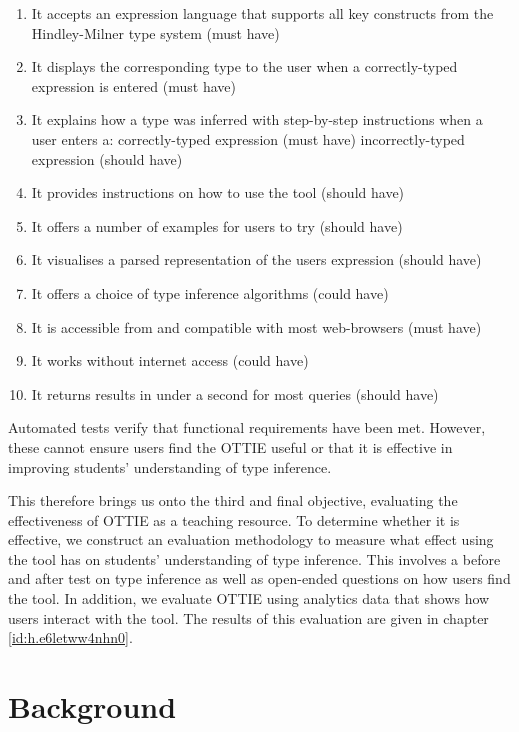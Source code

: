 \documentclass[a4paper,fleqn,oneside,12pt]{report}
\begin{document}
\begin{enumerate}
  \item It accepts an expression language that supports all key constructs from the Hindley-Milner type system (must have)
  \item It displays the corresponding type to the user when a correctly-typed expression is entered (must have)
  \item It explains how a type was inferred with step-by-step instructions when a user enters a:
    \subitem correctly-typed expression (must have)
    \subitem incorrectly-typed expression (should have)
  \item It provides instructions on how to use the tool (should have)
  \item It offers a number of examples for users to try (should have)
  \item It visualises a parsed representation of the users expression (should have)
  \item It offers a choice of type inference algorithms (could have)
  \item It is accessible from and compatible with most web-browsers (must have)
  \item It works without internet access (could have)
  \item It returns results in under a second for most queries (should have)
\end{enumerate}

Automated tests verify that functional requirements have been met. However, these cannot ensure users find the OTTIE useful or that it is effective in improving students' understanding of type inference.

This therefore brings us onto the third and final objective, evaluating the effectiveness of OTTIE as a teaching resource. To determine whether it is effective, we construct an evaluation methodology to measure what effect using the tool has on students' understanding of type inference. This involves a before and after test on type inference as well as open-ended questions on how users find the tool. In addition, we evaluate OTTIE using analytics data that shows how users interact with the tool. The results of this evaluation are given in chapter \ref{id:h.e6letww4nhn0}.

\chapter{Background}\label{id:h.ebjyqi73zdyo}
\end{document}
